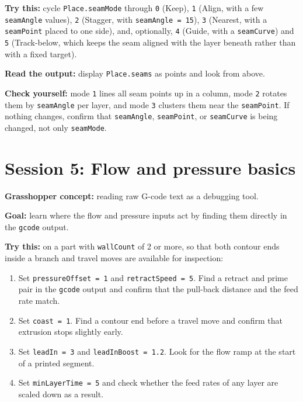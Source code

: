 \documentclass[11pt]{article}
\newcommand{\param}[1]{\texttt{#1}}
\newcommand{\exlabel}[1]{\par\vspace{0.3em}\noindent\textbf{#1:}\enspace}
\begin{document}
\exlabel{Try this} cycle \param{Place.seamMode} through
\param{0} (Keep), \param{1} (Align, with a few \param{seamAngle}
values), \param{2} (Stagger, with \param{seamAngle = 15}), \param{3}
(Nearest, with a \param{seamPoint} placed to one side), and,
optionally, \param{4} (Guide, with a \param{seamCurve}) and \param{5}
(Track-below, which keeps the seam aligned with the layer beneath
rather than with a fixed target).

\exlabel{Read the output} display \param{Place.seams} as points
and look from above.

\exlabel{Check yourself} mode \param{1} lines all seam points up in a
column, mode \param{2} rotates them by \param{seamAngle} per layer, and
mode \param{3} clusters them near the \param{seamPoint}. If nothing
changes, confirm that \param{seamAngle}, \param{seamPoint}, or
\param{seamCurve} is being changed, not only \param{seamMode}.

\section{Session 5: Flow and pressure basics}

\exlabel{Grasshopper concept} reading raw G-code text as a debugging
tool.

\exlabel{Goal} learn where the flow and pressure inputs act by finding
them directly in the \param{gcode} output.

\exlabel{Try this} on a part with \param{wallCount} of 2 or more, so
that both contour ends inside a branch and travel moves are available
for inspection:
\begin{enumerate}
  \item Set \param{pressureOffset = 1} and \param{retractSpeed = 5}. Find a retract and prime pair in the \param{gcode} output and confirm that the pull-back distance and the feed rate match.
  \item Set \param{coast = 1}. Find a contour end before a travel move and confirm that extrusion stops slightly early.
  \item Set \param{leadIn = 3} and \param{leadInBoost = 1.2}. Look for the flow ramp at the start of a printed segment.
  \item Set \param{minLayerTime = 5} and check whether the feed rates of any layer are scaled down as a result.
\end{enumerate}
\end{document}
